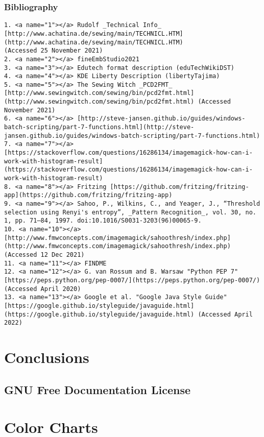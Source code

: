 \documentclass[a4paper, 11pt]{report}
\begin{document}
\subsection{Bibliography}

\begin{verbatim}
1. <a name="1"></a> Rudolf _Technical Info_ [http://www.achatina.de/sewing/main/TECHNICL.HTM](http://www.achatina.de/sewing/main/TECHNICL.HTM)
(Accessed 25 November 2021)
2. <a name="2"></a> fineEmbStudio2021
3. <a name="3"></a> Edutech format description (eduTechWikiDST)
4. <a name="4"></a> KDE Liberty Description (libertyTajima)
5. <a name="5"></a> The Sewing Witch _PCD2FMT_ [http://www.sewingwitch.com/sewing/bin/pcd2fmt.html](http://www.sewingwitch.com/sewing/bin/pcd2fmt.html) (Accessed November 2021)
6. <a name="6"></a> [http://steve-jansen.github.io/guides/windows-batch-scripting/part-7-functions.html](http://steve-jansen.github.io/guides/windows-batch-scripting/part-7-functions.html)
7. <a name="7"></a> [https://stackoverflow.com/questions/16286134/imagemagick-how-can-i-work-with-histogram-result](https://stackoverflow.com/questions/16286134/imagemagick-how-can-i-work-with-histogram-result)
8. <a name="8"></a> Fritzing [https://github.com/fritzing/fritzing-app](https://github.com/fritzing/fritzing-app)
9. <a name="9"></a> Sahoo, P., Wilkins, C., and Yeager, J., “Threshold selection using Renyi's entropy”, _Pattern Recognition_, vol. 30, no. 1, pp. 71–84, 1997. doi:10.1016/S0031-3203(96)00065-9.
10. <a name="10"></a> [http://www.fmwconcepts.com/imagemagick/sahoothresh/index.php](http://www.fmwconcepts.com/imagemagick/sahoothresh/index.php) (Accessed 12 Dec 2021)
11. <a name="11"></a> FINDME
12. <a name="12"></a> G. van Rossum and B. Warsaw "Python PEP 7" [https://peps.python.org/pep-0007/](https://peps.python.org/pep-0007/) (Accessed April 2020)
13. <a name="13"></a> Google et al. "Google Java Style Guide" [https://google.github.io/styleguide/javaguide.html](https://google.github.io/styleguide/javaguide.html) (Accessed April 2022)
\end{verbatim}

%

\chapter{Conclusions}




\appendix

\section{GNU Free Documentation License}

\chapter{Color Charts}
\end{document}
